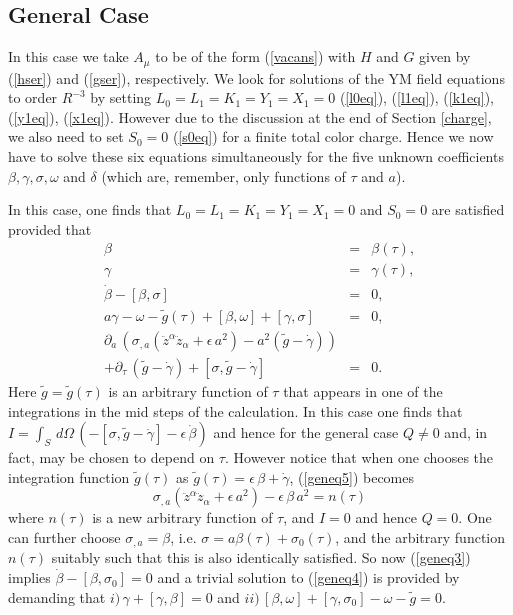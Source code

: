 \documentclass[a4paper,twocolumn,prd,showpacs,amsmath,amssymb]{revtex4}
\begin{document}
\subsection{\label{gensol} General Case}

In this case we take $A_{\mu}$ to be of the form (\ref{vacans}) with
$H$ and $G$ given by (\ref{hser}) and (\ref{gser}), respectively.
We look for solutions of the YM field equations to order $R^{-3}$ by
setting $L_{0}=L_{1}=K_{1}=Y_{1}=X_{1}=0$ (\ref{l0eq}), (\ref{l1eq}), (\ref{k1eq}),
(\ref{y1eq}), (\ref{x1eq}). However due to the discussion at the end of Section
\ref{charge}, we also need to set $S_{0}=0$ (\ref{s0eq}) for a finite total
color charge. Hence we now have to solve these six equations simultaneously
for the five unknown coefficients $\beta, \gamma, \sigma, \omega$ and $\delta$
(which are, remember, only functions of $\tau$ and $a$).

In this case, one finds that $L_{0}=L_{1}=K_{1}=Y_{1}=X_{1}=0$ and $S_{0}=0$
are satisfied provided that
\begin{eqnarray}
\beta & = & \beta(\tau) , \label{geneq1} \\
\gamma & = & \gamma(\tau) , \label{geneq2} \\
\dot{\beta} - [\beta,\sigma] & = & 0 , \label{geneq3} \\
a \gamma - \omega - \tilde{g}(\tau) + [\beta,\omega] + [\gamma,\sigma] & = & 0 , \label{geneq4} \\
\partial_{a} \, (\sigma_{,a} (\ddot{z}^{\alpha} \ddot{z}_{\alpha}
+ \epsilon \, a^2) - a^2 (\tilde{g} - \dot{\gamma}))  & & \nonumber \\
+ \partial_{\tau} \, (\tilde{g} - \dot{\gamma})
+ [\sigma, \tilde{g} - \dot{\gamma}] & = & 0 . \label{geneq5}
\end{eqnarray}
Here $\tilde{g}=\tilde{g}(\tau)$ is an arbitrary function of $\tau$ that appears
in one of the integrations in the mid steps of the calculation. In this case one
finds that \( I = \int_{S} \, d\Omega \,
(- [\sigma, \tilde{g} - \dot{\gamma}]- \epsilon \, \dot{\beta})\)
and hence for the general case $Q \neq 0$ and, in fact, may be chosen to
depend on $\tau$. However notice that when one chooses the integration function
$\tilde{g}(\tau)$ as $\tilde{g}(\tau)=\epsilon \, \beta + \dot{\gamma}$, (\ref{geneq5})
becomes
\[ \sigma_{,a} (\ddot{z}^{\alpha} \ddot{z}_{\alpha} + \epsilon \, a^2)
- \epsilon \, \beta \, a^2 = n(\tau) \]
where $n(\tau)$ is a new arbitrary function of $\tau$, and $I=0$ and hence $Q=0$.
One can further choose $\sigma_{,a}=\beta$, i.e. $\sigma=a \beta(\tau) + \sigma_{0}(\tau)$,
and the arbitrary function $n(\tau)$ suitably such that this is also identically satisfied.
So now (\ref{geneq3}) implies $\dot{\beta} - [\beta,\sigma_{0}] = 0$ and a trivial solution
to (\ref{geneq4}) is provided by demanding that $i) \, \gamma + [\gamma,\beta]=0$ and
$ii) \, [\beta,\omega] + [\gamma,\sigma_{0}] - \omega - \tilde{g} =0$.
\end{document}
